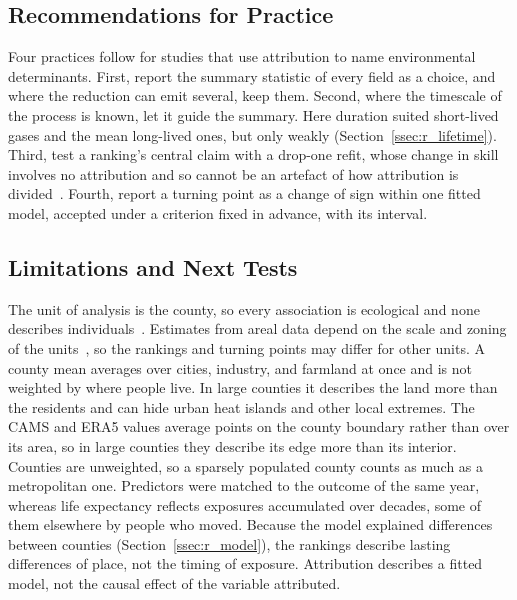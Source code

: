 \documentclass[sensors,article,submit,moreauthors,pdftex]{Definitions/mdpi}
\begin{document}
\subsection{Recommendations for Practice}
\label{ssec:d_practice}
Four practices follow for studies that use attribution to name environmental
determinants. First, report the summary statistic of every field as a choice,
and where the reduction can emit several, keep them. Second, where the
timescale of the process is known, let it guide the summary. Here duration
suited short-lived gases and the mean long-lived ones, but only weakly
(Section~\ref{ssec:r_lifetime}). Third, test a ranking's central claim with a
drop-one
refit, whose change in skill involves no attribution and so cannot be an
artefact of how attribution is divided~\cite{Lei2018, Hooker2021}. Fourth, report a turning point as a change of
sign within one fitted model, accepted under a criterion fixed in advance,
with its interval.

\subsection{Limitations and Next Tests}
\label{ssec:d_limits}
The unit of analysis is the county, so every association is ecological and
none describes individuals~\cite{Robinson1950, Schwartz1994}. Estimates from areal
data depend on the scale and zoning of the units~\cite{Fotheringham1991}, so the
rankings and turning points may differ for other units. A county mean averages over cities, industry, and
farmland at once and is not weighted by where people live. In large counties
it describes the land more than the residents and can hide urban heat islands
and other local extremes. The CAMS and ERA5 values average points on the
county boundary rather than over its area, so in large counties they describe
its edge more than its interior. Counties are unweighted, so a sparsely populated
county counts as much as a
metropolitan one. Predictors were matched to the outcome of the same
year, whereas life expectancy reflects exposures accumulated over decades,
some of them elsewhere by people who moved. Because the model explained
differences between counties
(Section~\ref{ssec:r_model}), the rankings describe lasting differences of
place, not the timing of exposure. Attribution describes a fitted
model, not the causal effect of the variable attributed.
\end{document}
